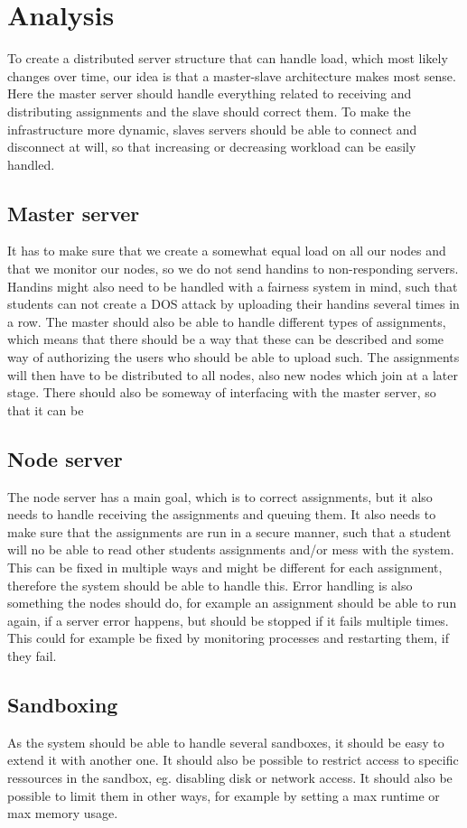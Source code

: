 \section*{Analysis}
To create a distributed server structure that can handle load, which most
likely changes over time, our idea is that a master-slave architecture makes
most sense. Here the master server should handle everything related to receiving
and distributing assignments and the slave should correct them. To make the
infrastructure more dynamic, slaves servers should be able to connect and
disconnect at will, so that increasing or decreasing workload can be easily
handled.

\subsection*{Master server}
It has to
make sure that we create a somewhat equal load on all our nodes and that we
monitor our nodes, so we do not send handins to non-responding servers.
Handins might also need to be handled with a fairness system in mind, such that
students can not create a DOS attack by uploading their handins several times in
a row.
The master should also be able to handle different types of assignments, which
means that there should be a way that these can be described and some way of
authorizing the users who should be able to upload such.
The assignments will then have to be distributed to all nodes, also new nodes
which join at a later stage.
There should also be someway of interfacing with the master server, so that it
can be 

\subsection*{Node server}
The node server has a main goal, which is to correct assignments, but it also
needs to handle receiving the assignments and queuing them. It also needs to
make sure that the assignments are run in a secure manner, such that a student
will no be able to read other students assignments and/or mess with the system.
This can be fixed in multiple ways and might be different for each assignment,
therefore the system should be able to handle this.
Error handling is also something the nodes should do, for example an assignment
should be able to run again, if a server error happens, but should be stopped if
it fails multiple times. This could for example be fixed by monitoring processes
and restarting them, if they fail.

\subsection*{Sandboxing}
As the system should be able to handle several sandboxes, it should be easy to
extend it with another one. It should also be possible to restrict access to
specific ressources in the sandbox, eg. disabling disk or network access.
It should also be possible to limit them in other ways, for example by setting
a max runtime or max memory usage.

